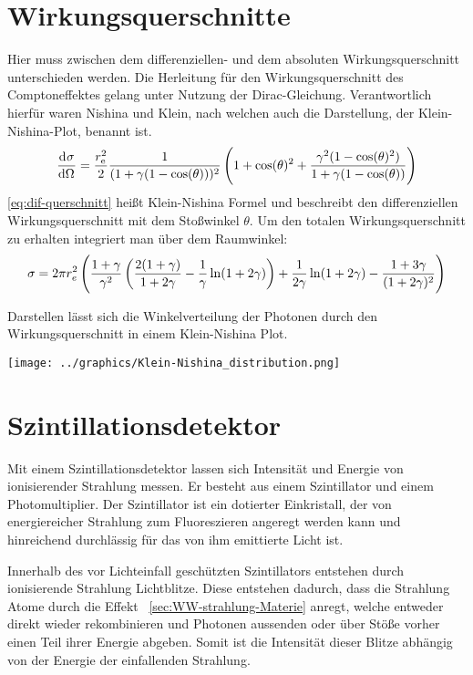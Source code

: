 \documentclass[11pt, ngerman, fleqn, DIV=15, headinclude, BCOR=2cm]{scrreprt}
\begin{document}
\section{Wirkungsquerschnitte}
Hier muss zwischen dem differenziellen- und dem absoluten Wirkungsquerschnitt
unterschieden werden.
Die Herleitung für den Wirkungsquerschnitt des Comptoneffektes gelang unter
Nutzung der Dirac-Gleichung. Verantwortlich hierfür waren Nishina und
Klein, nach welchen auch die Darstellung, der Klein-Nishina-Plot, benannt ist.
\[
    \dod \sigma\Omega = \frac{r^2_\text{e}}{2}
    \frac{1}{(1+\gamma(1-\cos(\theta)))^2}\del{1+\cos(\theta)^2+\frac{\gamma^2(1-\cos(\theta)^2)}{1+\gamma(1-\cos(\theta))}}
\]
\label{eq:dif-querschnitt}
\ref{eq:dif-querschnitt} heißt Klein-Nishina Formel und beschreibt den
differenziellen Wirkungsquerschnitt mit dem Stoßwinkel $\theta$.
Um den totalen Wirkungsquerschnitt zu erhalten integriert man über dem
Raumwinkel:
\[
    \sigma = 2\pi r^2_e
    \del{\frac{1+\gamma}{\gamma^2}\del{\frac{2(1+\gamma)}{1+2\gamma}-\frac
        1\gamma\ln(1+2\gamma)}+\frac
    1{2\gamma}\ln(1+2\gamma)-\frac{1+3\gamma}{(1+2\gamma)^2}}
\]

Darstellen lässt sich die Winkelverteilung der Photonen durch den Wirkungsquerschnitt in einem
Klein-Nishina Plot. 

\texttt{[image: ../graphics/Klein-Nishina\_distribution.png]}
\parencite{klein-nishina}

\section{Szintillationsdetektor}
Mit einem Szintillationsdetektor lassen sich Intensität und Energie von
ionisierender Strahlung messen.
Er besteht aus einem Szintillator und einem Photomultiplier.
Der Szintillator ist ein dotierter Einkristall, der von energiereicher
Strahlung zum Fluoreszieren angeregt werden kann und hinreichend
durchlässig für das von ihm emittierte Licht ist.

Innerhalb des vor Lichteinfall geschützten Szintillators entstehen durch
ionisierende Strahlung Lichtblitze. 
Diese entstehen dadurch, dass die Strahlung Atome durch die Effekt
~\ref{sec:WW-strahlung-Materie} anregt, welche entweder direkt
wieder rekombinieren und Photonen aussenden oder über Stöße vorher einen Teil
ihrer Energie abgeben.
Somit ist die Intensität dieser Blitze abhängig von der Energie der einfallenden Strahlung.
\end{document}
